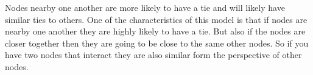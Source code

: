 Nodes nearby one another are more likely to have a tie and will likely have similar ties to others. One of the characteristics of this model is that if nodes are nearby one another they are highly likely to have a tie. But also if the nodes are closer together then they are going to be close to the same other nodes. So if you have two nodes that interact they are also similar form the perspective of other nodes. 






